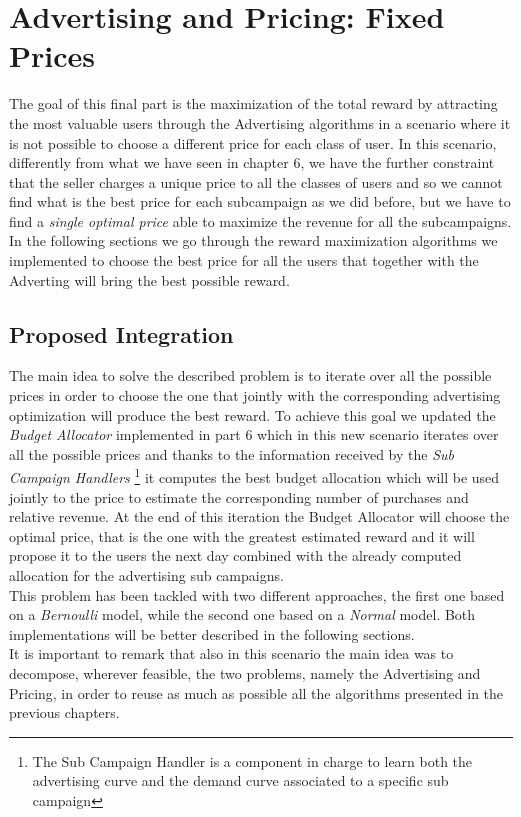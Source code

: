\chapter{Advertising and Pricing: Fixed Prices}

The goal of this final part is the maximization of the total reward by attracting the most valuable users through the Advertising algorithms in a scenario where it is not possible to choose a different price for each class of user. In this scenario, differently from what we have seen in chapter 6, we have the further constraint that the seller charges a unique price to all the classes of users and so we cannot find what is the best price for each subcampaign as we did before, but we have to find a \textit{single optimal price} able to maximize the revenue for all the subcampaigns.\\ In the following sections we go through the reward maximization algorithms we implemented to choose the best price for all the users that together with the Adverting will bring the best possible reward.


\section{Proposed Integration}
The main idea to solve the described problem is to iterate over all the possible prices in order to choose the one that jointly with the corresponding advertising optimization will produce the best reward.
To achieve this goal we updated the \textit{Budget Allocator} implemented in part 6 which in this new scenario iterates over all the possible prices and thanks to the information received by the \textit{Sub Campaign Handlers} \footnote{The Sub Campaign Handler is a component in charge to learn both the advertising curve and the demand curve associated to a specific sub campaign} it computes the best budget allocation which will be used jointly to the price to estimate the corresponding number of purchases and relative revenue. At the end of this iteration the Budget Allocator will choose the optimal price, that is the one with the greatest estimated reward and it will propose it to the users the next day combined with the already computed allocation for the advertising sub campaigns.\\ This problem has been tackled with two different approaches, the first one based on a \textit{Bernoulli} model, while the second one based on a \textit{Normal} model. Both implementations will be better described in the following sections. \\It is important to remark that also in this scenario the main idea was to decompose, wherever feasible, the two problems, namely the Advertising and Pricing, in order to reuse as much as possible all the algorithms presented in the previous chapters.



